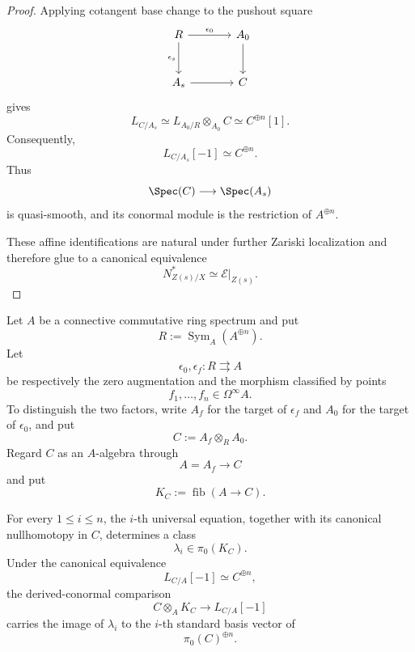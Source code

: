 \begin{proof}
Applying cotangent base change to the pushout square
\[
\begin{tikzcd}[column sep=large, row sep=large]
    R
        \arrow[r, "\epsilon_0"]
        \arrow[d, "\epsilon_s"']
    &
    A_0
        \arrow[d]
    \\
    A_s
        \arrow[r]
    &
    C
\end{tikzcd}
\]
gives
\[
    L_{C/A_s}
    \simeq
    L_{A_0/R}\otimes_{A_0}C
    \simeq
    C^{\oplus n}[1].
\]
Consequently,
\[
    L_{C/A_s}[-1]
    \simeq
    C^{\oplus n}.
\]
Thus
\[
    \Spec(C)
    \longrightarrow
    \Spec(A_s)
\]
is quasi-smooth, and its conormal module is the restriction of
\(A^{\oplus n}\).

These affine identifications are natural under further Zariski
localization and therefore glue to a canonical equivalence
\[
    N^*_{Z(s)/X}
    \simeq
    \mathcal E|_{Z(s)}.
\]
\end{proof}

\begin{lemma}
\label{lem:universal-equations-conormal-basis}
Let \(A\) be a connective commutative ring spectrum and put
\[
    R
    :=
    \operatorname{Sym}_A(A^{\oplus n}).
\]
Let
\[
    \epsilon_0,
    \epsilon_f
    \colon
    R
    \rightrightarrows
    A
\]
be respectively the zero augmentation and the morphism classified by
points
\[
    f_1,\ldots,f_n
    \in
    \Omega^\infty A.
\]
To distinguish the two factors, write \(A_f\) for the target of
\(\epsilon_f\) and \(A_0\) for the target of \(\epsilon_0\), and put
\[
    C
    :=
    A_f\otimes_RA_0.
\]
Regard \(C\) as an \(A\)-algebra through
\[
    A=A_f
    \longrightarrow
    C
\]
and put
\[
    K_C
    :=
    \operatorname{fib}(A\to C).
\]

For every \(1\leq i\leq n\), the \(i\)-th universal equation, together
with its canonical nullhomotopy in \(C\), determines a class
\[
    \lambda_i
    \in
    \pi_0(K_C).
\]
Under the canonical equivalence
\[
    L_{C/A}[-1]
    \simeq
    C^{\oplus n},
\]
the derived-conormal comparison
\[
    C\otimes_AK_C
    \longrightarrow
    L_{C/A}[-1]
\]
carries the image of \(\lambda_i\) to the \(i\)-th standard basis vector
of
\[
    \pi_0(C)^{\oplus n}.
\]
\end{lemma}

